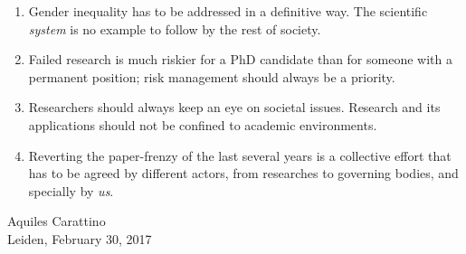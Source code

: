 \documentclass{dissertation}
\begin{document}
\begin{enumerate}
\item Gender inequality has to be addressed in a definitive way. The scientific
\textit{system} is no example to follow by the rest of society.

\item Failed research is much riskier for a PhD candidate than for someone with
a permanent position; risk management should always be a priority.

\item Researchers should always keep an eye on societal issues. Research and its
applications should not be confined to academic environments.

\item Reverting the paper-frenzy of the last several years is a collective
effort that has to be agreed by different actors, from researches to governing
bodies, and specially by \textit{us}.

\end{enumerate}

\bigskip
\bigskip

\begin{center}
Aquiles Carattino \\
Leiden, February 30, 2017
\end{center}
\end{document}

